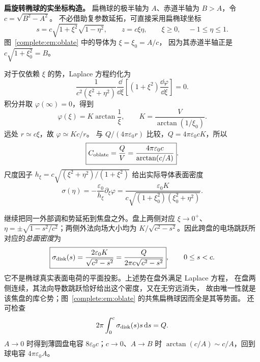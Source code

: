 \noindent\textbf{扁旋转椭球的实坐标构造。}
扁椭球的极半轴为 $A$、赤道半轴为 $B>A$，令 $c=\sqrt{B^2-A^2}$。
不必借助复参数延拓，可直接采用扁椭球坐标
\[
 s=c\sqrt{1+\xi^2}\sqrt{1-\eta^2},\qquad
 z=c\xi\eta,\qquad \xi\geq0,\quad-1\leq\eta\leq1.
\]
图~\ref{complete:em:oblate} 中的导体为 $\xi=\xi_0=A/c$，
因为其赤道半轴正是 $c\sqrt{1+\xi_0^2}=B$。

\begin{qualityfigure}
\end{qualityfigure}

对于仅依赖 $\xi$ 的势，Laplace 方程约化为
\[
 \frac1{c^2(\xi^2+\eta^2)}
 \frac{\dd}{\dd\xi}\left[(1+\xi^2)\frac{\dd\varphi}{\dd\xi}\right]=0.
\]
积分并取 $\varphi(\infty)=0$，得到
\[
 \varphi(\xi)=K\arctan\frac1\xi,\qquad
 K=\frac{V}{\arctan(1/\xi_0)}.
\]
远处 $r\simeq c\xi$，故 $\varphi\simeq Kc/r$。
与 $Q/(4\pi\varepsilon_0r)$ 比较，$Q=4\pi\varepsilon_0cK$，所以
\[
 \boxed{C_{\rm oblate}=\frac QV
 =\frac{4\pi\varepsilon_0c}{\arctan(c/A)}}.
\]
尺度因子 $h_\xi=c\sqrt{(\xi^2+\eta^2)/(1+\xi^2)}$ 给出实际导体表面密度
\[
 \sigma(\eta)=-\frac{\varepsilon_0}{h_\xi}\partial_\xi\varphi
 =\frac{\varepsilon_0K}
 {c\sqrt{(1+\xi_0^2)(\xi_0^2+\eta^2)}}.
\]

继续把同一外部调和势延拓到焦盘之外。盘上两侧对应 $\xi\to0^+$、
$\eta=\pm\sqrt{1-s^2/c^2}$；两侧外法向场大小均为
$K/\sqrt{c^2-s^2}$。因此跨盘的电场跳跃所对应的\emph{总面密度}为
\[
 \boxed{\sigma_{\rm disk}(s)=\frac{2\varepsilon_0K}{\sqrt{c^2-s^2}}
 =\frac{Q}{2\pi c\sqrt{c^2-s^2}}},\qquad 0\leq s<c.
\]
它不是椭球真实表面电荷的平面投影。上述势在盘外满足 Laplace 方程，
在盘两侧连续，其法向导数跳跃恰好给出这个密度，又在无穷远消失，
故由唯一性就是该焦盘的库仑势；图~\ref{complete:em:oblate} 的共焦扁椭球因而全是其等势面。
还可检查
\[
 2\pi\int_0^c\sigma_{\rm disk}(s)s\mathop{}\!\mathrm d s=Q.
\]
$A\to0$ 时得到薄圆盘电容 $8\varepsilon_0c$；$c\to0$、$A\to B$ 时
$\arctan(c/A)\sim c/A$，回到球电容 $4\pi\varepsilon_0A$。

